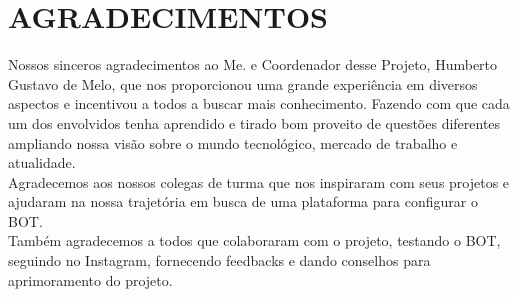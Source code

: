 \noindent\chapter*{\uppercase{Agradecimentos}}

Nossos sinceros agradecimentos ao Me. e Coordenador desse Projeto, Humberto Gustavo de Melo, que nos proporcionou uma grande experiência em diversos aspectos e incentivou a todos a buscar mais conhecimento. Fazendo com que cada um dos envolvidos tenha aprendido e tirado bom proveito de questões diferentes ampliando nossa visão sobre o mundo tecnológico, mercado de trabalho e atualidade. \\
Agradecemos aos nossos colegas de turma que nos inspiraram com seus projetos e ajudaram na nossa trajetória em busca de uma plataforma para configurar o BOT. \\
Também agradecemos a todos que colaboraram com o projeto, testando o BOT, seguindo no Instagram, fornecendo feedbacks e dando conselhos para aprimoramento do projeto.